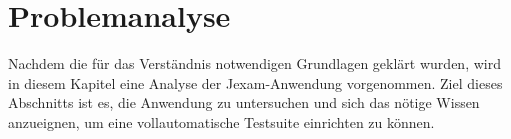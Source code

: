 \chapter{Problemanalyse}\label{ch:problemanalyse}


Nachdem die f\"ur das Verständnis notwendigen Grundlagen gekl\"art wurden,
wird in diesem Kapitel eine Analyse der Jexam-Anwendung vorgenommen.
Ziel dieses Abschnitts ist es, die Anwendung zu untersuchen und sich das
n\"otige Wissen anzueignen, um eine vollautomatische Testsuite
einrichten zu k\"onnen.




